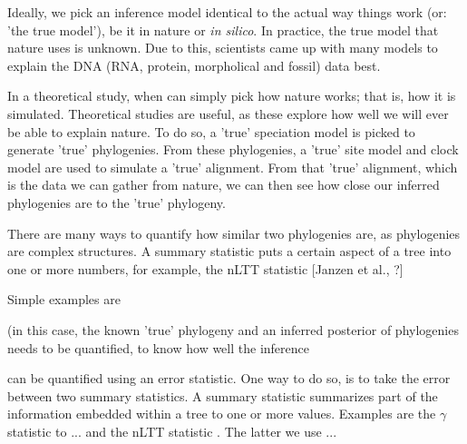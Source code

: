 Ideally, we pick an inference model identical to the actual way things 
work (or: 'the true model'), be it in nature
or \textit{in silico}. In practice, the true model that nature uses is unknown.
Due to this, scientists came up with many models to explain the 
DNA (RNA, protein, morpholical and fossil) data best.

In a theoretical study, when can simply pick how nature works; that is,
how it is simulated. Theoretical studies are useful, as these explore
how well we will ever be able to explain nature. To do so, a 'true' 
speciation model is picked to generate 'true' phylogenies. 
From these phylogenies, a 'true' site model and clock model are used to
simulate a 'true' alignment. From that 'true' alignment, which is the
data we can gather from nature, we can then see how close our inferred
phylogenies are to the 'true' phylogeny.


There are many ways to quantify how similar two phylogenies are,
as phylogenies are complex structures. A summary statistic puts
a certain aspect of a tree into one or more numbers, for example,
the nLTT statistic [Janzen et al., ?] 

Simple examples are 

(in this
case, the known 'true' phylogeny and an inferred posterior
of phylogenies needs to be quantified, to know how well the inference

can be quantified using an error statistic. One way to
do so, is to take the error between two summary statistics. A summary
statistic summarizes part of the information embedded within a tree to
one or more values. Examples are the $\gamma$ statistic to ... and
the nLTT statistic . The latter we use ...

